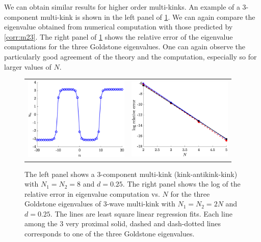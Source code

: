 \documentclass[12pt,reqno]{amsart}
\begin{document}
We can obtain similar results for higher order multi-kinks. An example of a 3-component multi-kink is shown in the left panel of \cref{fig:3p}. We can again compare the eigenvalue obtained from numerical computation with those predicted by \cref{corr:m23}. The right panel of \cref{fig:3p} shows the relative error of the eigenvalue computations for the three Goldstone eigenvalues.
One can again observe the particularly good agreement
of the theory and the computation, especially so for
larger values of $N$.

\begin{figure}[H]
	\begin{center}
	\begin{tabular}{cc}
	\includegraphics[width=5cm]{3kink.eps} &
	\includegraphics[width=5cm]{goldstone3prelerror.eps}
	\end{tabular}
	\end{center}
	\caption{The left panel shows a 3-component multi-kink (kink-antikink-kink) with $N_1 = N_2 = 8$ and $d = 0.25$. 
	The right panel shows the log of the relative error in eigenvalue computation vs. $N$ for the three Goldstone eigenvalues of 3-wave multi-kink with $N_1 = N_2 = 2N$ and $d = 0.25$. The lines are least square linear regression fits. Each line among the 3 very proximal solid, dashed and dash-dotted
	lines corresponds to one of the three Goldstone eigenvalues.} 
	\label{fig:3p}
\end{figure}
\end{document}
